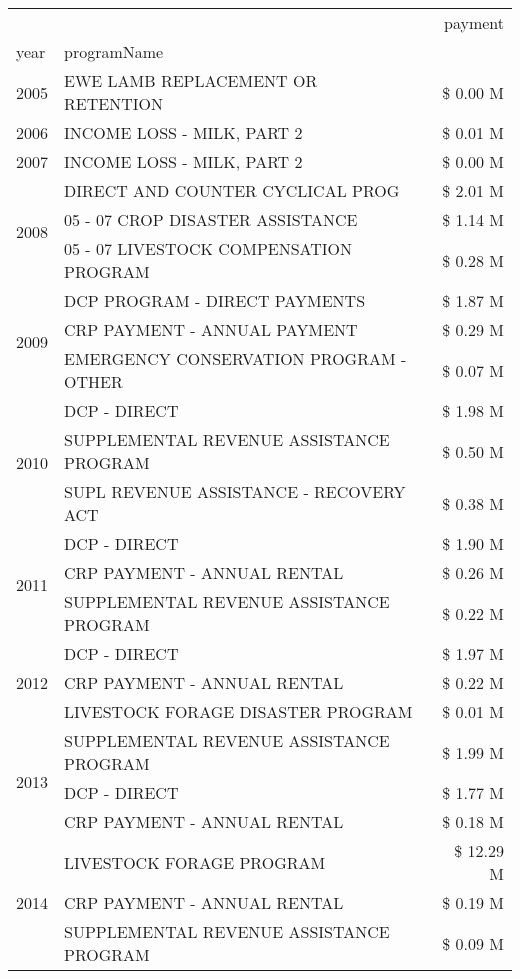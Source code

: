 \begin{tabular}{llr}
\toprule
 &  & payment \\
year & programName &  \\
\midrule
2005 & EWE LAMB REPLACEMENT OR RETENTION & \$ 0.00 M \\
\cline{1-3}
2006 & INCOME LOSS - MILK, PART 2 & \$ 0.01 M \\
\cline{1-3}
2007 & INCOME LOSS - MILK, PART 2 & \$ 0.00 M \\
\cline{1-3}
\multirow[t]{3}{*}{2008} & DIRECT AND COUNTER CYCLICAL PROG & \$ 2.01 M \\
 & 05 - 07 CROP DISASTER ASSISTANCE & \$ 1.14 M \\
 & 05 - 07 LIVESTOCK COMPENSATION PROGRAM & \$ 0.28 M \\
\cline{1-3}
\multirow[t]{3}{*}{2009} & DCP PROGRAM - DIRECT PAYMENTS & \$ 1.87 M \\
 & CRP PAYMENT - ANNUAL PAYMENT & \$ 0.29 M \\
 & EMERGENCY CONSERVATION PROGRAM - OTHER & \$ 0.07 M \\
\cline{1-3}
\multirow[t]{3}{*}{2010} & DCP - DIRECT & \$ 1.98 M \\
 & SUPPLEMENTAL REVENUE ASSISTANCE PROGRAM & \$ 0.50 M \\
 & SUPL REVENUE ASSISTANCE - RECOVERY ACT & \$ 0.38 M \\
\cline{1-3}
\multirow[t]{3}{*}{2011} & DCP - DIRECT & \$ 1.90 M \\
 & CRP PAYMENT - ANNUAL RENTAL & \$ 0.26 M \\
 & SUPPLEMENTAL REVENUE ASSISTANCE PROGRAM & \$ 0.22 M \\
\cline{1-3}
\multirow[t]{3}{*}{2012} & DCP - DIRECT & \$ 1.97 M \\
 & CRP PAYMENT - ANNUAL RENTAL & \$ 0.22 M \\
 & LIVESTOCK FORAGE DISASTER PROGRAM & \$ 0.01 M \\
\cline{1-3}
\multirow[t]{3}{*}{2013} & SUPPLEMENTAL REVENUE ASSISTANCE PROGRAM & \$ 1.99 M \\
 & DCP - DIRECT & \$ 1.77 M \\
 & CRP PAYMENT - ANNUAL RENTAL & \$ 0.18 M \\
\cline{1-3}
\multirow[t]{3}{*}{2014} & LIVESTOCK FORAGE PROGRAM & \$ 12.29 M \\
 & CRP PAYMENT - ANNUAL RENTAL & \$ 0.19 M \\
 & SUPPLEMENTAL REVENUE ASSISTANCE PROGRAM & \$ 0.09 M \\
\cline{1-3}

\end{tabular}
